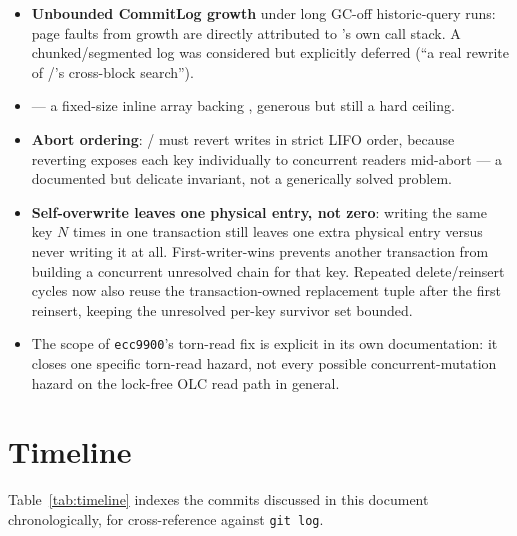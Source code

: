 \documentclass[11pt]{article}
\newcommand{\commit}[1]{\texttt{#1}}
\begin{document}
\begin{itemize}
  \item \textbf{Unbounded CommitLog growth} under long GC-off historic-query runs: page
        faults from  growth are directly attributed to 's own call
        stack. A chunked/segmented log was considered but explicitly deferred (``a real
        rewrite of /'s cross-block search'').
  \item {} --- a fixed-size inline array backing
        , generous but still a hard ceiling.
  \item \textbf{Abort ordering}: / must revert
        writes in strict LIFO order, because reverting exposes each key individually to
        concurrent readers mid-abort --- a documented but delicate invariant, not a
        generically solved problem.
  \item \textbf{Self-overwrite leaves one physical entry, not zero}: writing the same key
        $N$ times in one transaction still leaves one extra physical entry versus never
        writing it at all. First-writer-wins prevents another transaction from building
        a concurrent unresolved chain for that key. Repeated delete/reinsert cycles now
        also reuse the transaction-owned replacement tuple after the first reinsert,
        keeping the unresolved per-key survivor set bounded.
  \item The scope of \commit{ecc9900}'s torn-read fix is explicit in its own
        documentation: it closes one specific torn-read hazard, not every possible
        concurrent-mutation hazard on the lock-free OLC read path in general.
\end{itemize}

\section{Timeline}
\label{sec:timeline}

Table~\ref{tab:timeline} indexes the commits discussed in this document chronologically,
for cross-reference against \texttt{git log}.
\end{document}
